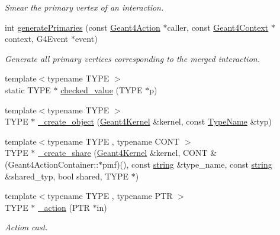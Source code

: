 \begin{DoxyCompactItemize}
\begin{DoxyCompactList}\small\item\em Smear the primary vertex of an interaction. \item\end{DoxyCompactList}\item 
int \hyperlink{namespace_d_d4hep_1_1_simulation_af9101fceaeec2ab63e17c360a22638cd}{generatePrimaries} (const \hyperlink{class_d_d4hep_1_1_simulation_1_1_geant4_action}{Geant4Action} $\ast$caller, const \hyperlink{class_d_d4hep_1_1_simulation_1_1_geant4_context}{Geant4Context} $\ast$context, G4Event $\ast$event)
\begin{DoxyCompactList}\small\item\em Generate all primary vertices corresponding to the merged interaction. \item\end{DoxyCompactList}\item 
{\footnotesize template$<$typename TYPE $>$ }\\static TYPE $\ast$ \hyperlink{namespace_d_d4hep_1_1_simulation_aad70a90170b1696df9bf23dfa12cdd99}{checked\_\-value} (TYPE $\ast$p)
\item 
{\footnotesize template$<$typename TYPE $>$ }\\TYPE $\ast$ \hyperlink{namespace_d_d4hep_1_1_simulation_af440512bf20439e1b6defb5c164f8d13}{\_\-create\_\-object} (\hyperlink{class_d_d4hep_1_1_simulation_1_1_geant4_kernel}{Geant4Kernel} \&kernel, const \hyperlink{class_d_d4hep_1_1_simulation_1_1_type_name}{TypeName} \&typ)
\item 
{\footnotesize template$<$typename TYPE , typename CONT $>$ }\\TYPE $\ast$ \hyperlink{namespace_d_d4hep_1_1_simulation_a66508df08a361db2c99e9b5c265d9e23}{\_\-create\_\-share} (\hyperlink{class_d_d4hep_1_1_simulation_1_1_geant4_kernel}{Geant4Kernel} \&kernel, CONT \&(Geant4ActionContainer::$\ast$pmf)(), const \hyperlink{classstd_1_1string}{string} \&type\_\-name, const \hyperlink{classstd_1_1string}{string} \&shared\_\-typ, bool shared, TYPE $\ast$)
\item 
{\footnotesize template$<$typename TYPE , typename PTR $>$ }\\TYPE $\ast$ \hyperlink{namespace_d_d4hep_1_1_simulation_a48f76eb1067558c924d3417d40fbb060}{\_\-action} (PTR $\ast$in)
\begin{DoxyCompactList}\small\item\em Action cast. \item\end{DoxyCompactList}\item 

\end{DoxyCompactItemize}
